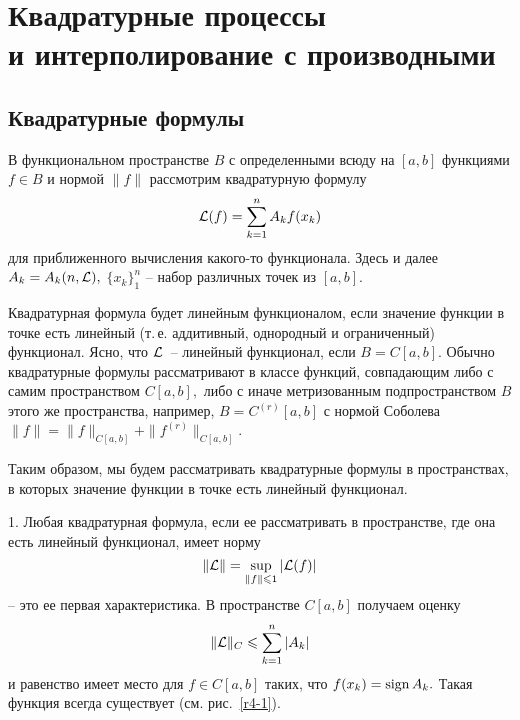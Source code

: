 
\chapter{Квадратурные процессы\\ и интерполирование с производными}

\section{Квадратурные формулы}

В функциональном пространстве  $B$ с определенными всюду на $[a,b]$ функциями
$f\in B$ и нормой $\|f\|$
рассмотрим квадратурную формулу
\begin{equation}
\label{Quad}
  \mathcal{L}(f)=\sum\limits_{k=1}^n A_kf(x_k)
\end{equation}
для приближенного вычисления какого-то функционала. Здесь и далее $A_k=A_k(n,\mathcal{L}),$ $\{x_k\}_{1}^n$ -- набор различных точек из $[a,b].$

Квадратурная формула будет линейным функционалом, если значение
функции в точке есть линейный (т.\,е. аддитивный,
однородный и ограниченный) функционал. Ясно, что $\mathcal{L}$~-- {линейный} функционал, если $B=C[a,b].$ Обычно квадратурные
формулы рассматривают в классе функций, совпадающим либо с
самим пространством $C[a,b],$ либо с
{иначе} метризованным подпространством $B$ этого же пространства, например,
$B=C^{(r)}[a,b]$ с нормой Соболева $\|f\|=\|f\|_{C[a,b]}+\|f^{(r)}\|_{C[a,b]}.$

Таким образом, мы будем рассматривать квадратурные формулы
в пространствах, в которых значение функции в точке
есть линейный функционал.

1. Любая квадратурная формула, если ее рассматривать в
пространстве, где она есть линейный функционал, имеет
норму
\[
  \|\mathcal{L} \|=\sup_{\|f\| \leqslant 1} |\mathcal{L} (f)|
\]
-- это ее первая характеристика. В пространстве {$C[a,b]$}
получаем оценку
\[
 \|\mathcal{L} \|_{C} \leqslant
              \sum\limits_{k=1}^n |A_k|
\]
и равенство имеет место для {$f \in C[a,b]$} таких, что $f(x_k)={\rm sign \, } A_k.$ Такая
функция всегда существует (см. рис.~\ref{r4-1}).


